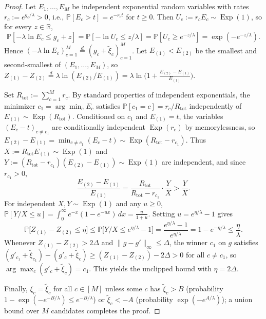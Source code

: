 \documentclass[11pt]{article}
\theoremstyle{definition}
\newcommand{\R}{\mathbb{R}}
\newcommand{\Prob}{\mathbb{P}}
\newcommand{\Expo}{\operatorname{Exp}}
\begin{document}
\begin{proof}
Let $E_1, \dots, E_M$ be independent exponential random variables with rates $r_c := e^{g_c / \lambda} > 0$, i.e., $\Prob[E_c > t] = e^{-r_c t}$ for $t \ge 0$. Then $U_c := r_c E_c \sim \Expo(1)$, so for every $z \in \R$,
\[
    \Prob[-\lambda \ln E_c \le g_c + z] = \Prob[-\ln U_c \le z/\lambda] = \Prob[U_c \ge e^{-z/\lambda}] = \exp(-e^{-z/\lambda}).
\]
Hence $(-\lambda \ln E_c)_{c=1}^M \stackrel{d}{=} (g_c + \tilde{\xi}_c)_{c=1}^M$. Let $E_{(1)} < E_{(2)}$ be the smallest and second-smallest of $(E_1, \dots, E_M)$, so $Z_{(1)} - Z_{(2)} \stackrel{d}{=} \lambda \ln(E_{(2)} / E_{(1)}) = \lambda \ln\big(1 + \frac{E_{(2)} - E_{(1)}}{E_{(1)}}\big)$.

Set $R_{\mathrm{tot}} := \sum_{c=1}^M r_c$. By standard properties of independent exponentials, the minimizer $c_1 = \arg\min_c E_c$ satisfies $\Prob[c_1 = c] = r_c / R_{\mathrm{tot}}$ independently of $E_{(1)} \sim \Expo(R_{\mathrm{tot}})$. Conditioned on $c_1$ and $E_{(1)} = t$, the variables $(E_c - t)_{c \ne c_1}$ are conditionally independent $\Expo(r_c)$ by memorylessness, so $E_{(2)} - E_{(1)} = \min_{c \ne c_1} (E_c - t) \sim \Expo(R_{\mathrm{tot}} - r_{c_1})$. Thus $X := R_{\mathrm{tot}} E_{(1)} \sim \Expo(1)$ and $Y := (R_{\mathrm{tot}} - r_{c_1})(E_{(2)} - E_{(1)}) \sim \Expo(1)$ are independent, and since $r_{c_1} > 0$,
\[
    \frac{E_{(2)} - E_{(1)}}{E_{(1)}} = \frac{R_{\mathrm{tot}}}{R_{\mathrm{tot}} - r_{c_1}} \cdot \frac{Y}{X} > \frac{Y}{X}.
\]
For independent $X, Y \sim \Expo(1)$ and any $u \ge 0$, $\Prob[Y/X \le u] = \int_0^\infty e^{-x}(1 - e^{-ux})\,dx = \frac{u}{1 + u}$. Setting $u = e^{\eta/\lambda} - 1$ gives
\[
    \Prob\big[Z_{(1)} - Z_{(2)} \le \eta\big] \le \Prob\big[Y/X \le e^{\eta/\lambda} - 1\big] = \frac{e^{\eta/\lambda} - 1}{e^{\eta/\lambda}} = 1 - e^{-\eta/\lambda} \le \frac{\eta}{\lambda}.
\]
Whenever $Z_{(1)} - Z_{(2)} > 2\Delta$ and $\|g - g'\|_\infty \le \Delta$, the winner $c_1$ on $g$ satisfies $(g'_{c_1} + \tilde{\xi}_{c_1}) - (g'_c + \tilde{\xi}_c) \ge (Z_{(1)} - Z_{(2)}) - 2\Delta > 0$ for all $c \ne c_1$, so $\arg\max_c (g'_c + \tilde{\xi}_c) = c_1$. This yields the unclipped bound with $\eta = 2\Delta$.

Finally, $\xi_c = \tilde{\xi}_c$ for all $c \in [M]$ unless some $c$ has $\tilde{\xi}_c > B$ (probability $1 - \exp(-e^{-B/\lambda}) \le e^{-B/\lambda}$) or $\tilde{\xi}_c < -A$ (probability $\exp(-e^{A/\lambda})$); a union bound over $M$ candidates completes the proof.
\end{proof}
\end{document}
